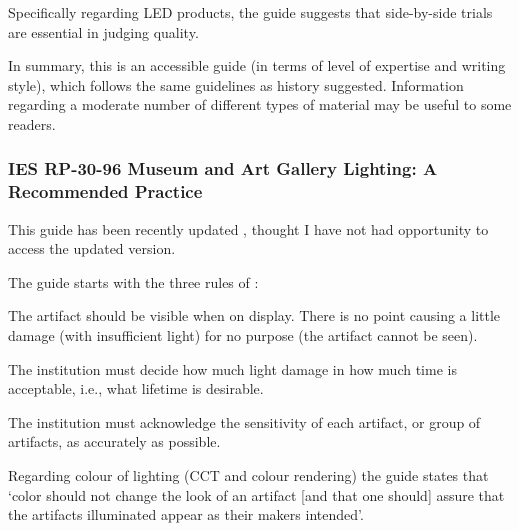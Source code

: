 Specifically regarding LED products, the guide suggests that side-by-side trials are essential in judging quality.

In summary, this is an accessible guide (in terms of level of expertise and writing style), which follows the same guidelines as history suggested. Information regarding a moderate number of different types of material may be useful to some readers.




\subsubsection{IES RP-30-96 Museum and Art Gallery Lighting: A Recommended Practice}

This guide \citep{ies_ies_1996} has been recently updated \citep{ies_ansi/ies_2017}, thought I have not had opportunity to access the updated version.

The guide starts with the three rules of \citet{michalski_damage_1987}:

\begin{itquote}{}
The artifact should be visible when on display. There is no point causing a little damage (with insufficient light) for no purpose (the artifact cannot be seen).

The institution must decide how much light damage in how much time is acceptable, i.e., what lifetime is desirable.

The institution must acknowledge the sensitivity of each artifact, or group of artifacts, as accurately as possible.
\end{itquote}

Regarding colour of lighting (\gls{CCT} and colour rendering) the guide states that `color should not change the look of an artifact [and that one should] assure that the artifacts illuminated appear as their makers intended'.

